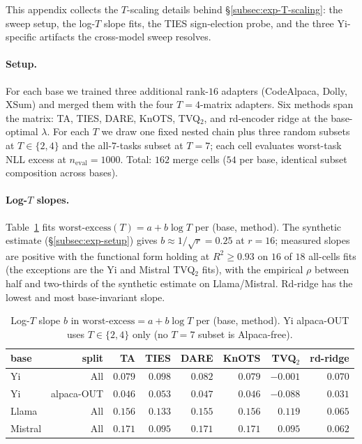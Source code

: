 This appendix collects the $T$-scaling details behind
\S\ref{subsec:exp-T-scaling}: the sweep setup, the log-$T$ slope fits,
the TIES sign-election probe, and the three Yi-specific artifacts the
cross-model sweep resolves.

\paragraph{Setup.} For each base we trained three additional rank-$16$
adapters (CodeAlpaca, Dolly, XSum) and merged them with the four
$T = 4$-matrix adapters. Six methods span the matrix: TA, TIES, DARE,
KnOTS, TVQ$_2$, and rd-encoder ridge at the base-optimal $\lambda$. For
each $T$ we draw one fixed nested chain plus three random subsets at
$T \in \{2, 4\}$ and the all-$7$-tasks subset at $T = 7$; each cell
evaluates worst-task NLL excess at $n_{\text{eval}} = 1000$. Total:
$162$ merge cells ($54$ per base, identical subset composition across
bases).

\paragraph{Log-$T$ slopes.} Table~\ref{tab:e6-slopes} fits
$\text{worst-excess}(T) = a + b\log T$ per (base, method). The
synthetic estimate (\S\ref{subsec:exp-setup}) gives
$b \approx 1/\sqrt{r} = 0.25$ at $r = 16$; measured slopes are
positive with the functional form holding at $R^2 \geq 0.93$ on $16$
of $18$ all-cells fits (the exceptions are the Yi and Mistral TVQ$_2$
fits), with the empirical $\rho$ between half and two-thirds of the
synthetic estimate on Llama/Mistral. Rd-ridge has the lowest and most
base-invariant slope.

\begin{table}[h]
\centering
\caption{Log-$T$ slope $b$ in $\text{worst-excess} = a + b\log T$ per
(base, method). Yi alpaca-OUT uses $T \in \{2, 4\}$ only (no $T = 7$
subset is Alpaca-free).}
\label{tab:e6-slopes}
\begin{tabular}{lr|rrrrrr}
\hline
base & split & TA & TIES & DARE & KnOTS & TVQ$_2$ & rd-ridge \\
\hline
Yi    & All        & $0.079$ & $0.098$ & $0.082$ & $0.079$ & $-0.001$ & $0.070$ \\
Yi    & alpaca-OUT & $0.046$ & $0.053$ & $0.047$ & $0.046$ & $-0.088$ & $0.031$ \\
Llama & All        & $0.156$ & $0.133$ & $0.155$ & $0.156$ & $0.119$ & $\mathbf{0.065}$ \\
Mistral & All      & $0.171$ & $0.095$ & $0.171$ & $0.171$ & $0.095$ & $\mathbf{0.062}$ \\
\hline
\end{tabular}
\end{table}

